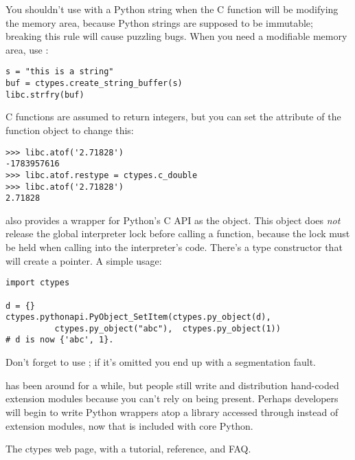 \documentclass{howto}
\begin{document}
You shouldn't use  with a Python string when the C function will be modifying the memory area, because Python strings are 
supposed to be immutable; breaking this rule will cause puzzling bugs.  When you need a modifiable memory area,
use :

\begin{verbatim}
s = "this is a string"
buf = ctypes.create_string_buffer(s)
libc.strfry(buf)
\end{verbatim}

C functions are assumed to return integers, but you can set
the  attribute of the function object to 
change this:

\begin{verbatim}
>>> libc.atof('2.71828')
-1783957616
>>> libc.atof.restype = ctypes.c_double
>>> libc.atof('2.71828')
2.71828
\end{verbatim}

 also provides a wrapper for Python's C API 
as the  object.  This object does \emph{not} 
release the global interpreter lock before calling a function, because the lock must be held when calling into the interpreter's code.  
There's a  type constructor that will create a 
 pointer.  A simple usage:

\begin{verbatim}
import ctypes

d = {}
ctypes.pythonapi.PyObject_SetItem(ctypes.py_object(d),
          ctypes.py_object("abc"),  ctypes.py_object(1))
# d is now {'abc', 1}.
\end{verbatim}

Don't forget to use ; if it's omitted you end 
up with a segmentation fault.

 has been around for a while, but people still write 
and distribution hand-coded extension modules because you can't rely on  being present.
Perhaps developers will begin to write 
Python wrappers atop a library accessed through  instead
of extension modules, now that  is included with core Python.

\begin{seealso}

{The ctypes web page, with a tutorial, reference, and FAQ.}

\end{seealso}
\end{document}
